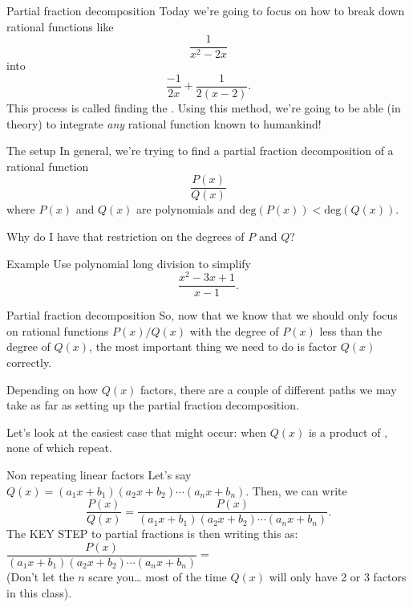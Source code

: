 \documentclass[presentation]{beamer}
\begin{document}
\begin{frame}[label={sec:org08de7f2}]{Partial fraction decomposition}
Today we're going to focus on how to break down rational functions
like
\[
\frac{1}{x^2-2x} \] into \[\frac{-1}{2x} + \frac{1}{2 \left( x-2
\right)}. \]
This process is called finding the \uline{\hspace*{2in}}.
Using this method, we're going to be able (in theory) to integrate
\emph{any} rational function known to humankind!
\end{frame}

\begin{frame}[label={sec:org3834c91}]{The setup}
In general, we're trying to find a partial fraction decomposition of a
rational function \[\frac{P(x)}{Q(x)} \] where \(P(x)\) and \(Q(x)\)
are polynomials and \(\text{deg} \left( P(x) \right) < \text{deg}
\left( Q(x) \right)\).

Why do I have that restriction on the degrees of \(P\) and \(Q\)?
\vspace{10in}
\end{frame}

\begin{frame}[label={sec:org069df80}]{Example}
Use polynomial long division to simplify
\[
\frac{x^2-3x+1}{x-1}. \]

\vspace{10in}
\end{frame}
\begin{frame}[label={sec:orgd01a4fe}]{Partial fraction decomposition}
So, now that we know that we should only focus on rational functions
\(P \left( x \right)/Q \left( x \right)\) with the degree of \(P
\left( x \right)\) less than the degree of \(Q \left( x \right)\),
the most important thing we need to do is factor \(Q \left( x \right)\) correctly.

Depending on how \(Q \left( x \right)\) factors, there are a couple
of different paths we may take as far as setting up the partial
fraction decomposition.

Let's look at the easiest case that might occur: when \(Q (x)\) is a
product of \uline{\hspace*{1in}}, none of which repeat.
\end{frame}

\begin{frame}[label={sec:orgeb99cc5}]{Non repeating linear factors}
Let's say \(Q(x) = \left( a_1x + b_1 \right) \left( a_2x + b_2 \right)
\cdots \left( a_nx+b_n \right)\).  Then, we can write
\[
\frac{P(x)}{Q(x)} = \frac{P(x)}{\left( a_1x + b_1 \right) \left( a_2x + b_2 \right)
\cdots \left( a_nx+b_n \right)}. \]
The \alert{KEY STEP} to partial fractions is then writing this as:
\[
 \frac{P(x)}{\left( a_1x + b_1 \right) \left( a_2x + b_2 \right)
\cdots \left( a_nx+b_n \right)} = \hspace{3in}\]
(Don't let the \(n\) scare you\ldots{} most of the time \(Q (x)\) will
only have 2 or 3 factors in this class).
\end{frame}
\end{document}
